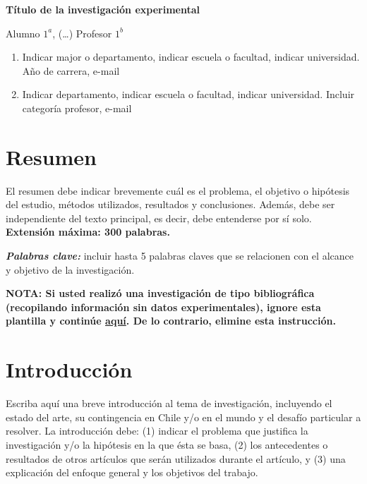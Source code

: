 \begin{center}
    \LARGE
    \textbf{Título de la investigación experimental}
    \label{sec:investigacion_experimental}
    
    \vspace{0.4cm}
    \large
    Alumno $1^a$, (…) Profesor $1^b$ 

    \vspace{0.4cm}
\end{center}

\begin{enumerate}[label=\alph*]
    \item Indicar major o departamento, indicar escuela o
facultad, indicar universidad. Año de carrera, e-mail
    \item Indicar departamento, indicar escuela o facultad,
indicar universidad. Incluir categoría profesor, e-mail
\end{enumerate}

\hrulefill

\section*{Resumen}

El resumen debe indicar brevemente cuál es el problema, el objetivo o
hipótesis del estudio, métodos utilizados, resultados y conclusiones.
Además, debe ser independiente del texto principal, es decir, debe
entenderse por sí solo. \textbf{Extensión máxima: 300 palabras.}

\emph{\textbf{Palabras clave:}} incluir hasta 5 palabras claves que se
relacionen con el alcance y objetivo de la investigación.

\hrulefill

\textbf{NOTA: Si usted realizó una investigación de tipo
bibliográfica (recopilando información sin datos experimentales), ignore
esta plantilla y continúe \hyperref[sec:investigacion_bibliografica]{aquí}. De lo contrario, elimine esta instrucción.}

\section{Introducción}

Escriba aquí una breve introducción al tema de investigación, incluyendo
el estado del arte, su contingencia en Chile y/o en el mundo y el
desafío particular a resolver. La introducción debe: (1) indicar el
problema que justifica la investigación y/o la hipótesis en la que ésta
se basa, (2) los antecedentes o resultados de otros artículos que serán
utilizados durante el artículo, y (3) una explicación del enfoque
general y los objetivos del trabajo.

